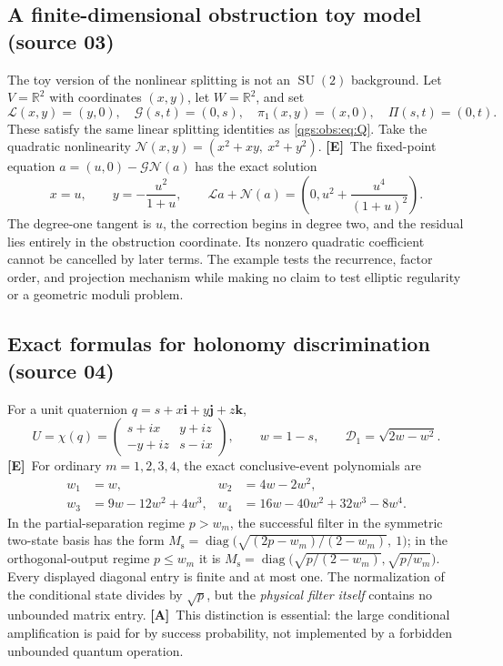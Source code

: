 \documentclass[11pt,oneside]{article}
\numberwithin{equation}{section}
\theoremstyle{plain}
\theoremstyle{definition}
\theoremstyle{remark}
\newcommand{\R}{\mathbb R}
\newcommand{\TD}{\mathcal D}
\newcommand{\qi}{\mathbf i}
\newcommand{\qj}{\mathbf j}
\newcommand{\qk}{\mathbf k}
\newcommand{\Lop}{\mathcal L}
\newcommand{\Green}{\mathcal G}
\DeclareMathOperator{\diag}{diag}
\DeclareMathOperator{\SU}{SU}
\newcommand{\TE}{\textcolor{TierE}{\textsf{\bfseries[E]}}}
\newcommand{\TA}{\textcolor{TierA}{\textsf{\bfseries[A]}}}
\begin{document}
\subsection{A finite-dimensional obstruction toy model (source 03)}
The toy version of the nonlinear splitting is not an $\SU(2)$ background. Let $V=\R^2$ with coordinates $(x,y)$, let $W=\R^2$, and set
\[
 \Lop(x,y)=(y,0),\quad \Green(s,t)=(0,s),\quad
 \pi_1(x,y)=(x,0),\quad \Pi(s,t)=(0,t).
\]
These satisfy the same linear splitting identities as \eqref{qgs:obs:eq:Q}. Take the quadratic nonlinearity $\mathcal N(x,y)=(x^2+xy,\ x^2+y^2)$. \TE\ The fixed-point equation $a=(u,0)-\Green\mathcal N(a)$ has the exact solution
\begin{equation}
 x=u,\qquad y=-\frac{u^2}{1+u},\qquad
 \Lop a+\mathcal N(a)=\left(0,u^2+\frac{u^4}{(1+u)^2}\right).
\end{equation}
The degree-one tangent is $u$, the correction begins in degree two, and the residual lies entirely in the obstruction coordinate. Its nonzero quadratic coefficient cannot be cancelled by later terms. The example tests the recurrence, factor order, and projection mechanism while making no claim to test elliptic regularity or a geometric moduli problem.

\subsection{Exact formulas for holonomy discrimination (source 04)}
For a unit quaternion $q=s+x\qi+y\qj+z\qk$,
\[
 U=\chi(q)=\begin{pmatrix}s+ix&y+iz\\-y+iz&s-ix\end{pmatrix},
 \qquad w=1-s,
 \qquad \TD_1=\sqrt{2w-w^2}.
\]
\TE\ For ordinary $m=1,2,3,4$, the exact conclusive-event polynomials are
\begin{align*}
 w_1&=w, &
 w_2&=4w-2w^2,\\
 w_3&=9w-12w^2+4w^3, &
 w_4&=16w-40w^2+32w^3-8w^4.
\end{align*}
In the partial-separation regime $p>w_m$, the successful filter in the symmetric two-state basis has the form $M_{\mathrm s}=\diag\bigl(\sqrt{(2p-w_m)/(2-w_m)},\ 1\bigr)$; in the orthogonal-output regime $p\le w_m$ it is $M_{\mathrm s}=\diag\bigl(\sqrt{p/(2-w_m)},\sqrt{p/w_m}\bigr)$. Every displayed diagonal entry is finite and at most one. The normalization of the conditional state divides by $\sqrt p$, but the \emph{physical filter itself} contains no unbounded matrix entry. \TA\ This distinction is essential: the large conditional amplification is paid for by success probability, not implemented by a forbidden unbounded quantum operation.
\end{document}
